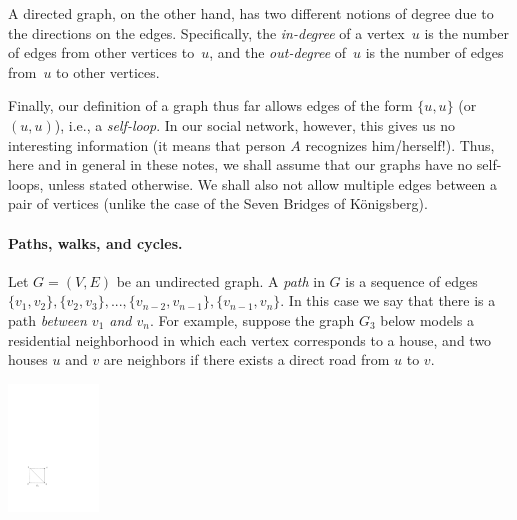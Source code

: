 \documentclass[11pt]{article}
\begin{document}

A directed graph, on the other hand, has two different notions of degree due to the directions on the edges. Specifically, the {\it in-degree\/} of a vertex~$u$ is the number of edges from other vertices to~$u$, and the {\it out-degree\/} of~$u$ is the number of edges from~$u$ to other vertices.


Finally, our definition of a graph thus far allows edges of the form $\{u,u\}$ (or $(u,u)$), i.e., a {\it self-loop\/}. In our social network, however, this gives us no interesting information (it means that person $A$ recognizes him/herself!). Thus, here and in general in these notes, we shall assume that our graphs have no self-loops, unless stated otherwise. We shall also not allow multiple edges between a pair of vertices (unlike the case of the Seven Bridges of K\"onigsberg).

\paragraph{Paths, walks, and cycles.} Let $G=(V,E)$ be an undirected graph. A {\it path\/} in $G$ is a sequence of edges $\{v_1,v_2\},\{v_2,v_3\},...,\{v_{n-2},v_{n-1}\},\{v_{n-1},v_n\}$. In this
case we say that there is a path {\it between $v_1$ and $v_n$}. For example, suppose the graph $G_3$ below models a residential neighborhood in which each vertex corresponds to a house, and two houses $u$ and $v$ are neighbors if there exists a direct road from $u$ to $v$.

\begin{center}
\includegraphics[height=3.4cm]{graph2.pdf}
\end{center}

\end{document}
